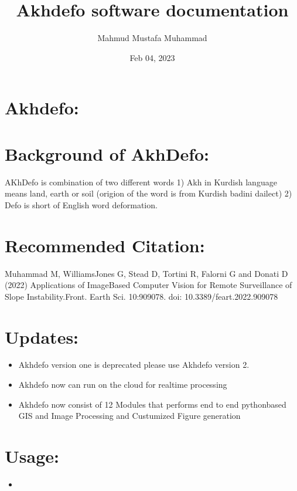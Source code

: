 \documentclass[letterpaper,10pt]{sphinxmanual}
\title{Akhdefo software documentation}
\date{Feb 04, 2023}
\author{Mahmud Mustafa Muhammad}
\begin{document}
\pagestyle{empty}
\cover
\pagestyle{plain}
\sphinxtableofcontents
\pagestyle{normal}
\label{\detokenize{index::doc}}


\sphinxstepscope


\chapter{Akhdefo:}
\label{\detokenize{README:akhdefo}}\label{\detokenize{README::doc}}

\chapter{Background of Akh\sphinxhyphen{}Defo:}
\label{\detokenize{README:background-of-akh-defo}}
\sphinxAtStartPar
AKh\sphinxhyphen{}Defo is combination of two different words 1) Akh in Kurdish language means land, earth or soil (origion of the word is from Kurdish badini dailect) 2) Defo is short of English word deformation.


\chapter{Recommended Citation:}
\label{\detokenize{README:recommended-citation}}
\sphinxAtStartPar
Muhammad M, Williams\sphinxhyphen{}Jones G, Stead D, Tortini R, Falorni G and Donati D (2022) Applications of ImageBased Computer Vision for Remote Surveillance of Slope Instability.Front. Earth Sci. 10:909078. doi: 10.3389/feart.2022.909078


\chapter{Updates:}
\label{\detokenize{README:updates}}\begin{itemize}
\item {} 
\sphinxAtStartPar
Akhdefo version one is deprecated please use Akhdefo version 2.

\item {} 
\sphinxAtStartPar
Akhdefo now can run on the cloud for real\sphinxhyphen{}time processing

\item {} 
\sphinxAtStartPar
Akhdefo now consist of 12 Modules that performs end to end python\sphinxhyphen{}based GIS and Image Processing and Custumized Figure generation

\end{itemize}


\chapter{Usage:}
\label{\detokenize{README:usage}}\begin{itemize}
\item {} 
\sphinxAtStartPar
{}

\end{itemize}
\end{document}
